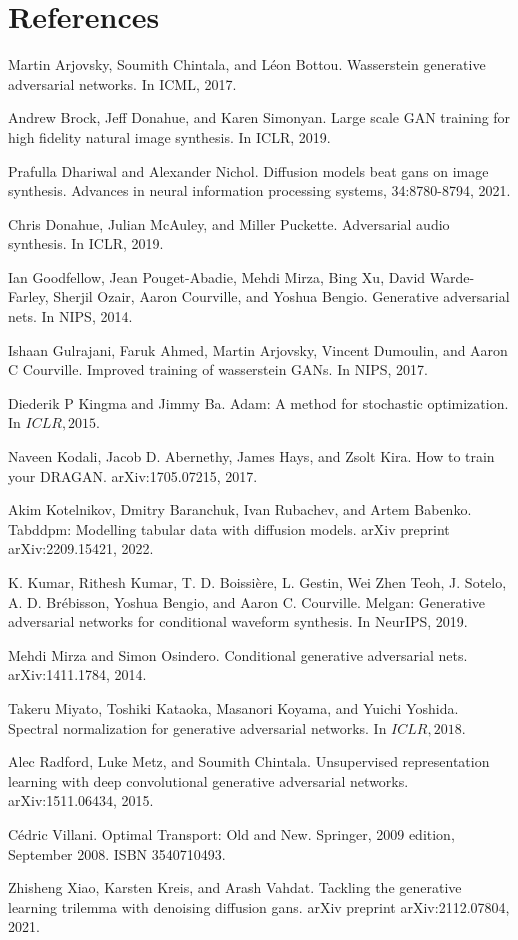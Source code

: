 \documentclass[10pt]{article}
\begin{document}
\section*{References}
Martin Arjovsky, Soumith Chintala, and Léon Bottou. Wasserstein generative adversarial networks. In ICML, 2017.

Andrew Brock, Jeff Donahue, and Karen Simonyan. Large scale GAN training for high fidelity natural image synthesis. In ICLR, 2019.

Prafulla Dhariwal and Alexander Nichol. Diffusion models beat gans on image synthesis. Advances in neural information processing systems, 34:8780-8794, 2021.

Chris Donahue, Julian McAuley, and Miller Puckette. Adversarial audio synthesis. In ICLR, 2019.

Ian Goodfellow, Jean Pouget-Abadie, Mehdi Mirza, Bing Xu, David Warde-Farley, Sherjil Ozair, Aaron Courville, and Yoshua Bengio. Generative adversarial nets. In NIPS, 2014.

Ishaan Gulrajani, Faruk Ahmed, Martin Arjovsky, Vincent Dumoulin, and Aaron C Courville. Improved training of wasserstein GANs. In NIPS, 2017.

Diederik P Kingma and Jimmy Ba. Adam: A method for stochastic optimization. In $I C L R, 2015$.

Naveen Kodali, Jacob D. Abernethy, James Hays, and Zsolt Kira. How to train your DRAGAN. arXiv:1705.07215, 2017.

Akim Kotelnikov, Dmitry Baranchuk, Ivan Rubachev, and Artem Babenko. Tabddpm: Modelling tabular data with diffusion models. arXiv preprint arXiv:2209.15421, 2022.

K. Kumar, Rithesh Kumar, T. D. Boissière, L. Gestin, Wei Zhen Teoh, J. Sotelo, A. D. Brébisson, Yoshua Bengio, and Aaron C. Courville. Melgan: Generative adversarial networks for conditional waveform synthesis. In NeurIPS, 2019.

Mehdi Mirza and Simon Osindero. Conditional generative adversarial nets. arXiv:1411.1784, 2014.

Takeru Miyato, Toshiki Kataoka, Masanori Koyama, and Yuichi Yoshida. Spectral normalization for generative adversarial networks. In $I C L R, 2018$.

Alec Radford, Luke Metz, and Soumith Chintala. Unsupervised representation learning with deep convolutional generative adversarial networks. arXiv:1511.06434, 2015.

Cédric Villani. Optimal Transport: Old and New. Springer, 2009 edition, September 2008. ISBN 3540710493.

Zhisheng Xiao, Karsten Kreis, and Arash Vahdat. Tackling the generative learning trilemma with denoising diffusion gans. arXiv preprint arXiv:2112.07804, 2021.
\end{document}
